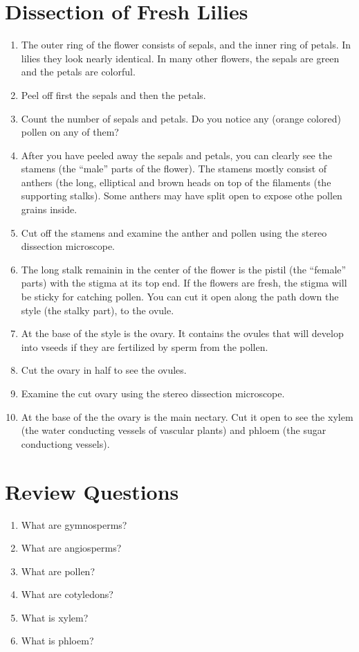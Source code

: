 \section{Dissection of Fresh Lilies}\label{dissection-of-fresh-lilies}

\begin{enumerate}
\def\labelenumi{\arabic{enumi}.}
\tightlist
\item
  The outer ring of the flower consists of sepals, and the inner ring of
  petals. In lilies they look nearly identical. In many other flowers,
  the sepals are green and the petals are colorful.
\item
  Peel off first the sepals and then the petals.
\item
  Count the number of sepals and petals. Do you notice any (orange
  colored) pollen on any of them?
\item
  After you have peeled away the sepals and petals, you can clearly see
  the stamens (the ``male'' parts of the flower). The stamens mostly
  consist of anthers (the long, elliptical and brown heads on top of the
  filaments (the supporting stalks). Some anthers may have split open to
  expose othe pollen grains inside.
\item
  Cut off the stamens and examine the anther and pollen using the stereo
  dissection microscope.
\item
  The long stalk remainin in the center of the flower is the pistil (the
  ``female'' parts) with the stigma at its top end. If the flowers are
  fresh, the stigma will be sticky for catching pollen. You can cut it
  open along the path down the style (the stalky part), to the ovule.
\item
  At the base of the style is the ovary. It contains the ovules that
  will develop into vseeds if they are fertilized by sperm from the
  pollen.
\item
  Cut the ovary in half to see the ovules.
\item
  Examine the cut ovary using the stereo dissection microscope.
\item
  At the base of the the ovary is the main nectary. Cut it open to see
  the xylem (the water conducting vessels of vascular plants) and phloem
  (the sugar conductiong vessels).
\end{enumerate}

\section{Review Questions}\label{review-questions-2}

\begin{enumerate}
\def\labelenumi{\arabic{enumi}.}
\tightlist
\item
  What are gymnosperms?
\item
  What are angiosperms?
\item
  What are pollen?
\item
  What are cotyledons?
\item
  What is xylem?
\item
  What is phloem?
\end{enumerate}
